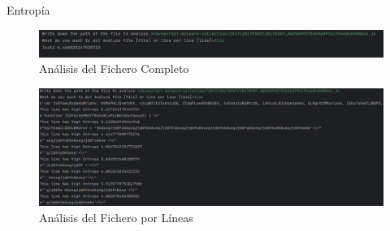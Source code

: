\documentclass[aspectratio=169]{beamer}
\begin{document}
    
   \begin{frame}{Entropía}
		\begin{figure}[H]
			\centering
			\includegraphics[width=13cm]{images/tool_1.png}
			\caption{Análisis del Fichero Completo}
		\end{figure}
		
		
		\begin{figure}[H]
			\centering
			\includegraphics[width=13cm]{images/tool_2.png}
			\caption{Análisis del Fichero por Líneas }
		\end{figure}
    \end{frame}
    
\end{document}
